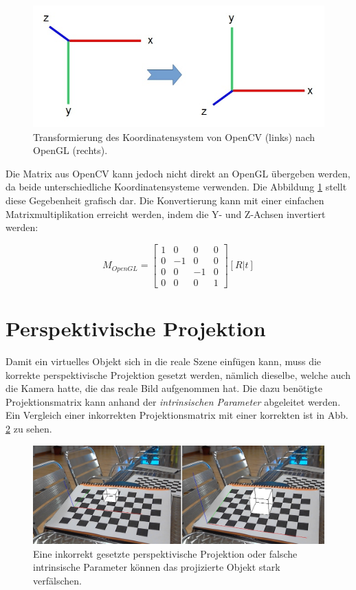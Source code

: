 \begin{figure}[!ht]
\centering
\includegraphics[scale=0.5]{images/opencv-to-opengl.jpg} 
\caption{Transformierung des Koordinatensystem von OpenCV (links) nach OpenGL (rechts).}
\label{fig:opencv-to-opengl}
\end{figure}


Die Matrix aus OpenCV kann jedoch nicht direkt an OpenGL übergeben werden, da beide unterschiedliche Koordinatensysteme verwenden. Die Abbildung \ref{fig:opencv-to-opengl} stellt diese Gegebenheit grafisch dar. Die Konvertierung kann mit einer einfachen Matrixmultiplikation erreicht werden, indem die Y- und Z-Achsen invertiert werden:

\begin{equation}
M_{OpenGL}
=
\begin{bmatrix}
1 & 0 & 0 & 0 \\
0 & -1 & 0 & 0 \\
0 & 0 & -1 & 0 \\
0 & 0 & 0 & 1
\end{bmatrix} 
[R | t]
\end{equation}

 
\section{Perspektivische Projektion}

Damit ein virtuelles Objekt sich in die reale Szene einfügen kann, muss die korrekte perspektivische Projektion gesetzt werden, nämlich dieselbe, welche auch die Kamera hatte, die das reale Bild aufgenommen hat. Die dazu benötigte Projektionsmatrix kann anhand der \textit{intrinsischen Parameter} abgeleitet werden. Ein Vergleich einer inkorrekten Projektionsmatrix mit einer korrekten ist in Abb. \ref{fig:opengl-perspective} zu sehen.


\begin{figure}[!ht]
\centering
\includegraphics[scale=0.5]{images/opengl-perspective.jpg} 
\caption{Eine inkorrekt gesetzte perspektivische Projektion oder falsche intrinsische Parameter können das projizierte Objekt stark verfälschen.}
\label{fig:opengl-perspective}
\end{figure}


